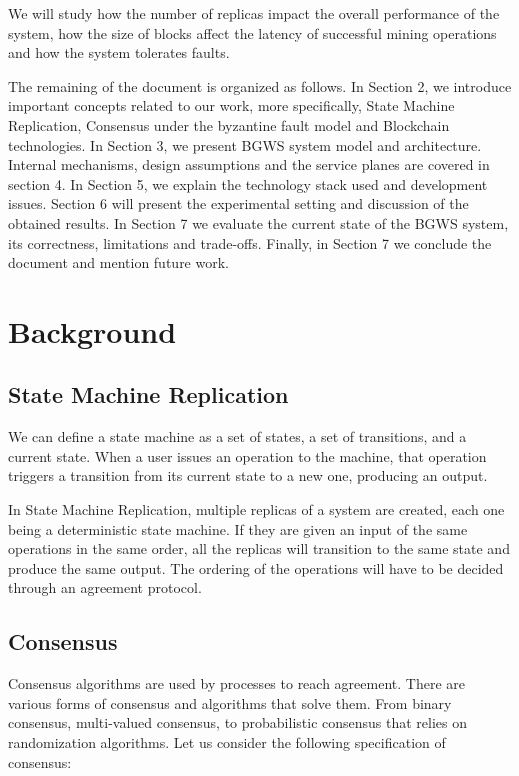 \documentclass[10pt,journal,compsoc]{IEEEtran}
\begin{document}
	We will study how the number of replicas impact the overall performance of the system, how the size of blocks affect the latency of successful mining operations and how the system tolerates faults.
		
	The remaining of the document is organized as follows.
	In Section 2, we introduce important concepts related to our work, more specifically, State Machine Replication, Consensus under the byzantine fault model and Blockchain technologies.
	In Section 3, we present BGWS system model and architecture.
	Internal mechanisms, design assumptions and the service planes are covered in section 4.
	In Section 5, we explain the technology stack used and development issues.
	Section 6 will present the experimental setting and discussion of the obtained results.
	In Section 7 we evaluate the current state of the BGWS system, its correctness, limitations and trade-offs.
	Finally, in Section 7 we conclude the document and mention future work.
	

	\section{Background}
	\subsection{State Machine Replication}
	We can define a state machine as a set of states, a set of transitions, and a current state. When a user issues an operation to the machine, that operation triggers a transition from its current state to a new one, producing an output. 

	In State Machine Replication, multiple replicas of a system are created, each one being a deterministic state machine. If they are given an input of the same operations in the same order, all the replicas will transition to the same state and produce the same output. The ordering of the operations will have to be decided through an agreement protocol. 

	\subsection{Consensus}
	Consensus algorithms are used by processes to reach agreement. There are various forms of consensus and algorithms that solve them\cite{lamport2001paxos}\cite{raft}. From binary consensus, multi-valued consensus, to probabilistic consensus that relies on randomization algorithms\cite{moniz2008ritas}\cite{moniz2006experimental}. Let us consider the following specification of consensus: 
\end{document}
